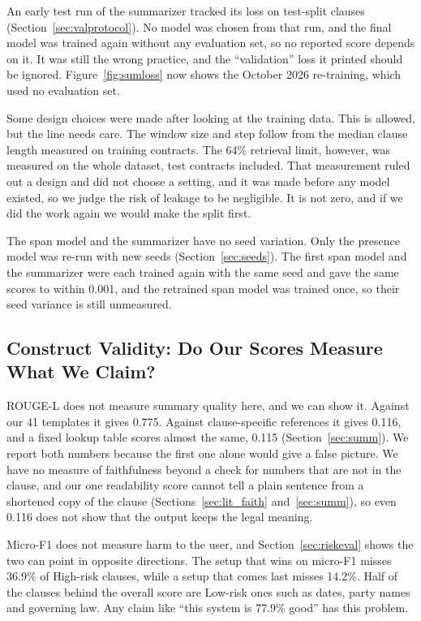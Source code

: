 An early test run of the summarizer tracked its loss on test-split clauses (Section~\ref{sec:valprotocol}). No model was chosen from that run, and the final model was trained again without any evaluation set, so no reported score depends on it. It was still the wrong practice, and the ``validation'' loss it printed should be ignored. Figure~\ref{fig:sumloss} now shows the October 2026 re-training, which used no evaluation set.

Some design choices were made after looking at the training data. This is allowed, but the line needs care. The window size and step follow from the median clause length measured on training contracts. The 64\% retrieval limit, however, was measured on the whole dataset, test contracts included. That measurement ruled out a design and did not choose a setting, and it was made before any model existed, so we judge the risk of leakage to be negligible. It is not zero, and if we did the work again we would make the split first.

The span model and the summarizer have no seed variation. Only the presence model was re-run with new seeds (Section~\ref{sec:seeds}). The first span model and the summarizer were each trained again with the same seed and gave the same scores to within 0.001, and the retrained span model was trained once, so their seed variance is still unmeasured.

\subsection{Construct Validity: Do Our Scores Measure What We Claim?}
ROUGE-L does not measure summary quality here, and we can show it. Against our 41 templates it gives 0.775. Against clause-specific references it gives 0.116, and a fixed lookup table scores almost the same, 0.115 (Section~\ref{sec:summ}). We report both numbers because the first one alone would give a false picture. We have no measure of faithfulness beyond a check for numbers that are not in the clause, and our one readability score cannot tell a plain sentence from a shortened copy of the clause (Sections~\ref{sec:lit_faith} and~\ref{sec:summ}), so even 0.116 does not show that the output keeps the legal meaning.

Micro-F1 does not measure harm to the user, and Section~\ref{sec:riskeval} shows the two can point in opposite directions. The setup that wins on micro-F1 misses 36.9\% of High-risk clauses, while a setup that comes last misses 14.2\%. Half of the clauses behind the overall score are Low-risk ones such as dates, party names and governing law. Any claim like ``this system is 77.9\% good'' has this problem.

